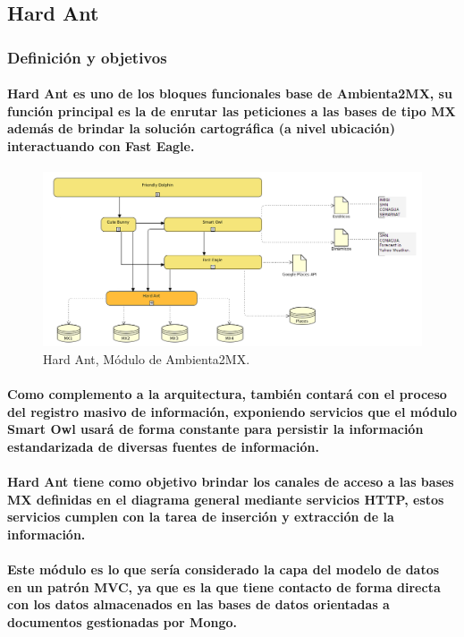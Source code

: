 \subsection{Hard Ant}
  \subsubsection{Definición y objetivos}    
    \paragraph{Hard Ant es uno de los bloques funcionales base de Ambienta2MX, su función principal es la de enrutar las peticiones a las bases de tipo MX además de brindar la solución cartográfica (a nivel ubicación) interactuando con Fast Eagle.}
    \begin{figure}[h!]
        \centering
          \includegraphics[width=\textwidth]{./images/DiagramaAmbienta2MX_HardAnt.png}
        \caption{Hard Ant, Módulo de Ambienta2MX.}
    \end{figure}
    \paragraph{Como complemento a la arquitectura, también contará con el proceso del registro masivo de información, exponiendo servicios que el módulo Smart Owl usará de forma constante para persistir la información estandarizada de diversas fuentes de información.}
    \paragraph{Hard Ant tiene como objetivo brindar los canales de acceso a las bases MX definidas en el diagrama general mediante servicios HTTP, estos servicios cumplen con la tarea de inserción y extracción de la información. }
    \paragraph{Este módulo es lo que sería considerado la capa del modelo de datos en un patrón MVC, ya que es la que tiene contacto de forma directa con los datos almacenados en las bases de datos orientadas a documentos gestionadas por Mongo.}
